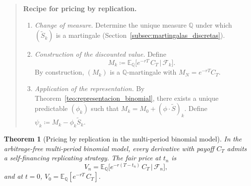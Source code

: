 \documentclass[11pt,a4paper,oneside]{report}
\theoremstyle{plain}
\newtheorem{teorema}{Theorem}[chapter]
\theoremstyle{definition}
\theoremstyle{remark}
\newcommand{\E}{\mathbb{E}}
\newcommand{\Q}{\mathbb{Q}}
\newcommand{\F}{\mathcal{F}}
\newcommand{\1}{\mathbf{1}}
\newcommand{\eqdef}{\coloneqq}
\begin{document}
\begin{quote}
\textbf{Recipe for pricing by replication.}
\begin{enumerate}[label=\textbf{Step \arabic*.}, leftmargin=*]
  \item \emph{Change of measure.} Determine the unique measure $\Q$
        under which $(\widetilde S_k)$ is a martingale
        (Section~\ref{subsec:martingalas_discretas}).
  \item \emph{Construction of the discounted value.} Define
        \begin{equation}\label{eq:def_M_replicante_discreto}
          M_k \eqdef \E_\Q\bigl[e^{-rT}\, C_T \,\big|\, \F_k\bigr].
        \end{equation}
        By construction, $(M_k)$ is a $\Q$-martingale with
        $M_N = e^{-rT} C_T$.
  \item \emph{Application of the representation.} By
        Theorem~\ref{teo:representacion_binomial}, there exists a
        unique predictable $(\phi_k)$ such that
        $M_k = M_0 + (\phi \cdot \widetilde S)_k$. Define
        $\psi_k \eqdef M_k - \phi_k \widetilde S_k$.
\end{enumerate}
\end{quote}

\begin{teorema}[Pricing by replication in the multi-period binomial model]
\label{teo:valoracion_binomial}
In the arbitrage-free multi-period binomial model, every derivative
with \emph{payoff} $C_T$ admits a self-financing replicating strategy.
The fair price at $t_n$ is
\begin{equation}\label{eq:precio_binomial_multi}
  V_n = \E_\Q\bigl[e^{-r(T - t_n)}\, C_T \,\big|\, \F_n\bigr],
\end{equation}
and at $t = 0$, $V_0 = \E_\Q[e^{-rT}\, C_T]$.
\end{teorema}
\end{document}
